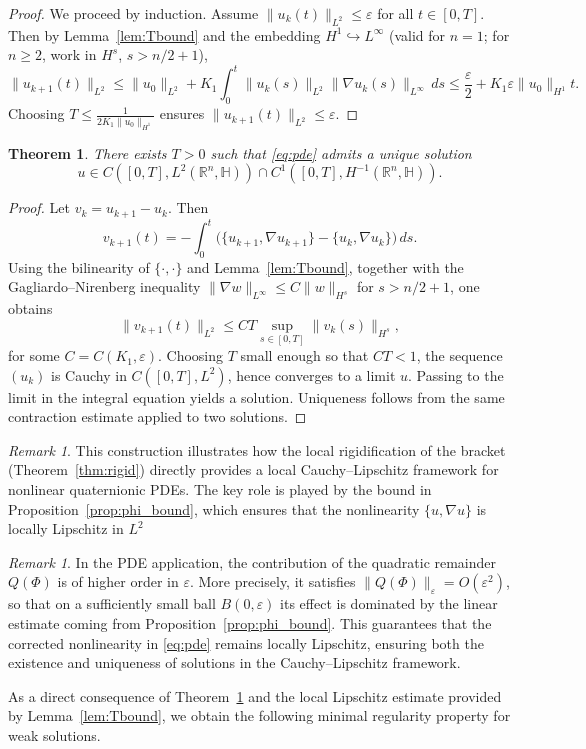 \documentclass[10pt]{amsart}
\numberwithin{equation}{section}
\newtheorem{thm}[theorem]{Theorem}
\theoremstyle{remark}
\newtheorem{rmk}[theorem]{Remark}
\theoremstyle{definition}
\begin{document}
\begin{proof}
We proceed by induction. Assume \(\|u_k(t)\|_{L^2} \leq \varepsilon\) for all \(t \in [0, T]\). Then by Lemma~\ref{lem:Tbound} and the embedding \(H^1 \hookrightarrow L^\infty\) (valid for \(n=1\); for \(n\geq 2\), work in \(H^s\), \(s > n/2+1\)),
\[
\|u_{k+1}(t)\|_{L^2} \leq \|u_0\|_{L^2} + K_1 \int_0^t \|u_k(s)\|_{L^2} \|\nabla u_k(s)\|_{L^\infty} \, ds
\leq \frac{\varepsilon}{2} + K_1 \varepsilon \|u_0\|_{H^1} t.
\]
Choosing \(T \leq \frac{1}{2 K_1 \|u_0\|_{H^1}}\) ensures \(\|u_{k+1}(t)\|_{L^2} \leq \varepsilon\).
\end{proof}


\begin{thm}\label{thm:local-wp}
There exists $T > 0$ such that \eqref{eq:pde} admits a unique solution
\[
u \in C([0, T], L^2(\mathbb{R}^n, \mathbb{H})) \cap C^1([0, T], H^{-1}(\mathbb{R}^n, \mathbb{H})).
\]
\end{thm}

\begin{proof}
Let $v_k = u_{k+1} - u_k$. Then
\[
v_{k+1}(t) = -\int_0^t \big( \{u_{k+1}, \nabla u_{k+1}\} - \{u_k, \nabla u_k\} \big) \, ds.
\]
Using the bilinearity of $\{\cdot,\cdot\}$ and Lemma~\ref{lem:Tbound}, together with the Gagliardo--Nirenberg inequality $\|\nabla w\|_{L^\infty} \leq C \|w\|_{H^s}$ for $s > n/2 + 1$, one obtains
\[
\|v_{k+1}(t)\|_{L^2} \leq C T \sup_{s \in [0,T]} \|v_k(s)\|_{H^s},
\]
for some $C = C(K_1, \varepsilon)$. Choosing $T$ small enough so that $C T < 1$, the sequence $(u_k)$ is Cauchy in $C([0,T], L^2)$, hence converges to a limit $u$. Passing to the limit in the integral equation yields a solution. Uniqueness follows from the same contraction estimate applied to two solutions.
\end{proof}




\begin{rmk}
This construction illustrates how the local rigidification of the bracket
(Theorem~\ref{thm:rigid}) directly provides a local Cauchy--Lipschitz
framework for nonlinear quaternionic PDEs. The key role is played by the bound
in Proposition~\ref{prop:phi_bound}, which ensures that the nonlinearity
$\{u,\nabla u\}$ is locally Lipschitz in $L^2$
\end{rmk}
\begin{rmk}
In the PDE application, the contribution of the quadratic remainder $Q(\Phi)$
is of higher order in $\varepsilon$. More precisely, it satisfies
$\|Q(\Phi)\|_\varepsilon = O(\varepsilon^2)$, so that on a sufficiently small
ball $B(0,\varepsilon)$ its effect is dominated by the linear estimate coming
from Proposition~\ref{prop:phi_bound}. This guarantees that the corrected
nonlinearity in \eqref{eq:pde} remains locally Lipschitz, ensuring both the
existence and uniqueness of solutions in the Cauchy--Lipschitz framework.
\end{rmk}
\medskip
\noindent
As a direct consequence of Theorem~\ref{thm:local-wp} and the local Lipschitz
estimate provided by Lemma~\ref{lem:Tbound}, we obtain the following minimal
regularity property for weak solutions.
\end{document}
